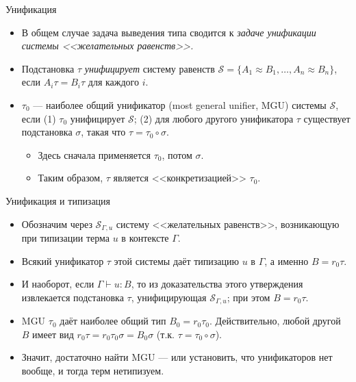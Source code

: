 \documentclass[xcolor=dvipsnames]{beamer}
\newcommand{\Sc}{\mathcal{S}}
\begin{document}
\begin{frame}{Унификация}

\begin{itemize}[<+->]
 \item В общем случае задача выведения типа сводится к {\em задаче унификации системы <<желательных равенств>>.}
 \item Подстановка $\tau$ {\em унифицирует} систему равенств $\Sc = \{ A_1 \approx B_1, \ldots, A_n \approx B_n\}$, если $A_i \tau = B_i \tau$ для каждого $i$.
 \item $\tau_0$ --- наиболее общий унификатор (most general unifier, MGU) системы $\Sc$, если (1) $\tau_0$ унифицирует $\Sc$; (2) для любого другого унификатора $\tau$ существует подстановка $\sigma$, такая что $\tau = \tau_0 \circ \sigma$.
 \begin{itemize}
 \item Здесь сначала применяется $\tau_0$, потом $\sigma$.
 \item Таким образом, $\tau$ является <<конкретизацией>> $\tau_0$.
 \end{itemize}
\end{itemize}

 
\end{frame}



\begin{frame}{Унификация и типизация}

\begin{itemize}[<+->]
 \item Обозначим через $\Sc_{\Gamma,u}$ систему <<желательных равенств>>, возникающую при типизации терма $u$ в контексте $\Gamma$.
 \item Всякий унификатор $\tau$ этой системы даёт типизацию $u$ в $\Gamma$, а именно $B = r_0 \tau$.
 \item И наоборот, если $\Gamma \vdash u : B$, то из доказательства этого утверждения извлекается подстановка $\tau$, унифицирующая $\Sc_{\Gamma,u}$; при этом $B = r_0 \tau$.
 \item MGU $\tau_0$ даёт наиболее общий тип $B_0 = r_0 \tau_0$. Действительно, любой другой $B$ имеет вид $r_0 \tau = r_0 \tau_0 \sigma = B_0 \sigma$ (т.к. $\tau = \tau_0 \circ \sigma$).
 \item Значит, достаточно найти MGU --- или установить, что унификаторов нет вообще, и тогда терм нетипизуем.
\end{itemize}

 
\end{frame}
\end{document}
